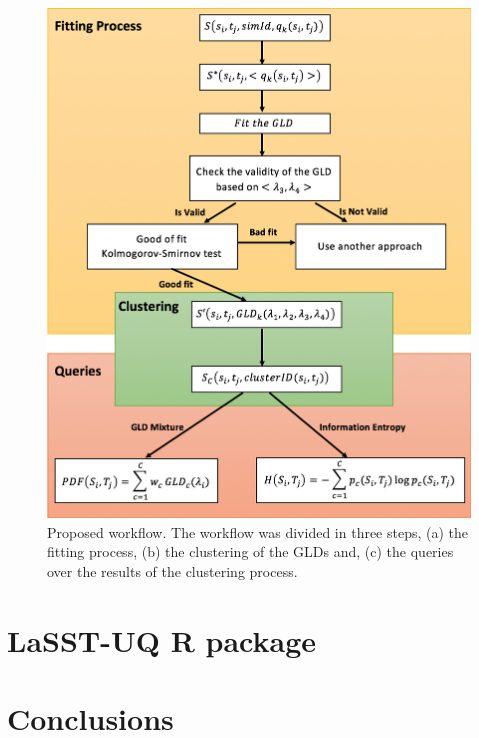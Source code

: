 \begin{figure}[H]
    \centering
    \includegraphics[width=1\textwidth]{img/Diagram.png}
    \caption{Proposed workflow. The workflow was divided in three steps, (a) the fitting process, (b) the clustering of the GLDs and, (c) the queries over the results of the clustering process.}
    \label{fig:workflow}
\end{figure}

\section{LaSST-UQ R package}

\section{Conclusions}